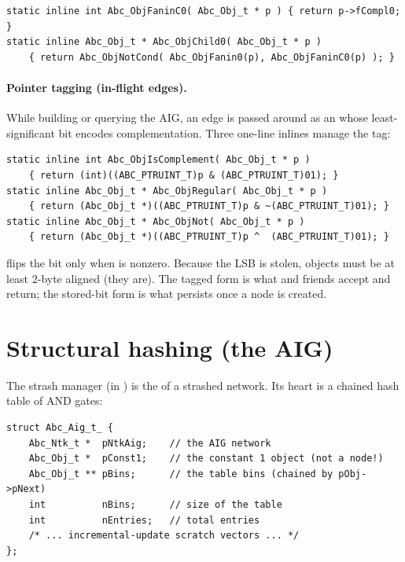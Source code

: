 \begin{lstlisting}[style=abccode]
static inline int Abc_ObjFaninC0( Abc_Obj_t * p ) { return p->fCompl0; }
static inline Abc_Obj_t * Abc_ObjChild0( Abc_Obj_t * p )
    { return Abc_ObjNotCond( Abc_ObjFanin0(p), Abc_ObjFaninC0(p) ); }
\end{lstlisting}

\paragraph{Pointer tagging (in-flight edges).} While building or querying the
AIG, an edge is passed around as an  whose least-significant bit
encodes complementation. Three one-line inlines manage the tag:

\begin{lstlisting}[style=abccode]
static inline int Abc_ObjIsComplement( Abc_Obj_t * p )
    { return (int)((ABC_PTRUINT_T)p & (ABC_PTRUINT_T)01); }
static inline Abc_Obj_t * Abc_ObjRegular( Abc_Obj_t * p )
    { return (Abc_Obj_t *)((ABC_PTRUINT_T)p & ~(ABC_PTRUINT_T)01); }
static inline Abc_Obj_t * Abc_ObjNot( Abc_Obj_t * p )
    { return (Abc_Obj_t *)((ABC_PTRUINT_T)p ^  (ABC_PTRUINT_T)01); }
\end{lstlisting}

 flips the bit only when  is nonzero. Because the
LSB is stolen, objects must be at least 2-byte aligned (they are). The tagged
form is what  and friends accept and return; the stored-bit form
is what persists once a node is created.

\section{Structural hashing (the AIG)}

The strash manager  (in )
is the  of a strashed network. Its heart is a chained hash table of
AND gates:

\begin{lstlisting}[style=abccode]
struct Abc_Aig_t_ {
    Abc_Ntk_t *  pNtkAig;    // the AIG network
    Abc_Obj_t *  pConst1;    // the constant 1 object (not a node!)
    Abc_Obj_t ** pBins;      // the table bins (chained by pObj->pNext)
    int          nBins;      // size of the table
    int          nEntries;   // total entries
    /* ... incremental-update scratch vectors ... */
};
\end{lstlisting}

